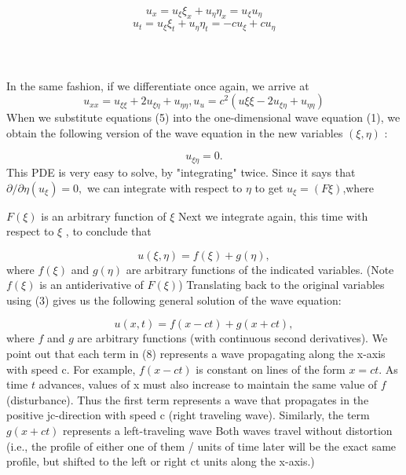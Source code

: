 \documentclass[../main.tex]{subfiles}
\begin{document}
$$u_x = u_\xi \xi_x + u_\eta \eta_x = u_\xi u_\eta$$
\begin{equation}
u_t =u_\xi \xi_t +u_\eta \eta_t =-cu_\xi+cu_\eta
\label{eq:eps}
\end{equation}
\\
\\
\\
In the same fashion, if we differentiate once again, we arrive at
\begin{equation}
u_{xx} =u_{\xi \xi}+2u_{\xi \eta}+u_{\eta \eta} , u_u = c^2(u{\xi \xi}-2u_{\xi \eta}+ u_{\eta \eta})  
\label{eq:eps}
\end{equation}
When we substitute equations (5) into the one-dimensional wave equation (1), we
obtain the following version of the wave equation in the new variables $(\xi ,\eta)$ : 

\begin{equation}
u_{\xi \eta}=0.
\label{eq:eps}
\end{equation}
This PDE is very easy to solve, by "integrating" twice. Since it says that $\partial /\partial \eta(u_\xi)=0,$ we can integrate with respect to $\eta$ to get $u_\xi=(F\xi)$,where


$F(\xi)$  is an arbitrary function of $\xi$ Next we integrate again, this time with respect
to $\xi$ , to conclude that

\begin{equation}
u(\xi,\eta)=f(\xi)+g(\eta),
\label{eq:eps}
\end{equation}
where $f(\xi)$ and $g(\eta)$ are arbitrary functions of the indicated variables. (Note  $f(\xi)$ is an antiderivative of $F(\xi)$) Translating back to the original variables
using (3) gives us the following general solution of the wave equation:

\begin{equation}
u(x,t)=f(x-ct)+g(x + ct),
\label{eq:eps}
\end{equation}
where $f$ and $g$ are arbitrary functions (with continuous second derivatives). We
point out that each term in (8) represents a wave propagating along the x-axis with
speed c. For example,  $f(x-ct)$  is constant on lines of the form $x = ct$. As time $t$
advances, values of x must also increase to maintain the same value of $f$ (disturbance). Thus the first term represents a wave that propagates in the positive
jc-direction with speed c (right traveling wave). Similarly, the term
$g(x + ct)$ represents a left-traveling wave Both waves travel without distortion
(i.e., the profile of either one of them / units of time later will be the exact same
profile, but shifted to the left or right ct units along the x-axis.)
\end{document}
